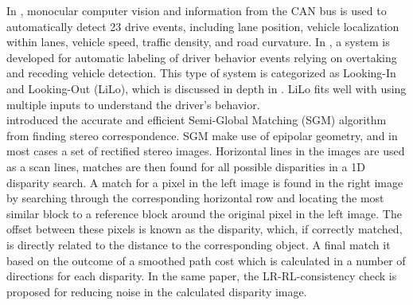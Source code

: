 



In \cite{raviLaneSemantics}, monocular computer vision and information from the CAN bus is used to automatically detect 23 drive events, including lane position, vehicle localization within lanes, vehicle speed, traffic density, and road curvature. In \cite{raviOvertaking}, a system is developed for automatic labeling of driver behavior events relying on overtaking and receding vehicle detection. This type of system is categorized as Looking-In and Looking-Out (LiLo), which is discussed in depth in \cite{trivedi2007looking}. LiLo fits well with using multiple inputs to understand the driver's behavior. \\%


\cite{HirschmullerRLandSGBM} introduced the accurate and efficient Semi-Global Matching (SGM) algorithm from finding stereo correspondence. SGM make use of epipolar geometry, and in most cases a set of rectified stereo images. Horizontal lines in the images are used as a scan lines, matches are then found for all possible disparities in a 1D disparity search. A match for a pixel in the left image is found in the right image by searching through the corresponding horizontal row and locating the most similar block to a reference block around the original pixel in the left image. The offset between these pixels is known as the disparity, which, if correctly matched, is directly related to the distance to the corresponding object. A final match it based on the outcome of a smoothed path cost which is calculated in a number of directions for each disparity. In the same paper, the LR-RL-consistency check is proposed for reducing noise in the calculated disparity image. \\

